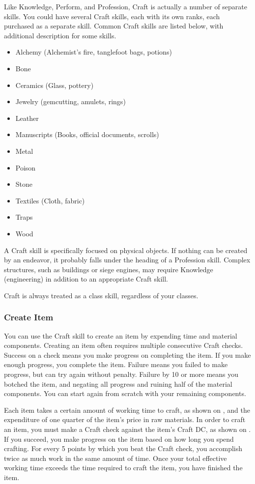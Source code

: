 Like Knowledge, Perform, and Profession, Craft is actually a number of separate skills. You could have several Craft skills, each with its own ranks, each purchased as a separate skill. Common Craft skills are listed below, with additional description for some skills.

\begin{itemize}
  \item Alchemy (Alchemist's fire, tanglefoot bags, potions)
  \item Bone
  \item Ceramics (Glass, pottery)
  \item Jewelry (gemcutting, amulets, rings)
  \item Leather
  \item Manuscripts (Books, official documents, scrolls)
  \item Metal
  \item Poison
  \item Stone
  \item Textiles (Cloth, fabric)
  \item Traps
  \item Wood
\end{itemize}

A Craft skill is specifically focused on physical objects. If nothing can be created by an endeavor, it probably falls under the heading of a Profession skill. Complex structures, such as buildings or siege engines, may require Knowledge (engineering) in addition to an appropriate Craft skill.

Craft is always treated as a class skill, regardless of your classes.

\subsubsection{Create Item}
You can use the Craft skill to create an item by expending time and material components. Creating an item often requires multiple consecutive Craft checks. Success on a check means you make progress on completing the item. If you make enough progress, you complete the item. Failure means you failed to make progress, but can try again without penalty. Failure by 10 or more means you botched the item, and negating all progress and ruining half of the material components. You can start again from scratch with your remaining components.

Each item takes a certain amount of working time to craft, as shown on , and the expenditure of one quarter of the item's price in raw materials. In order to craft an item, you must make a Craft check against the item's Craft DC, as shown on . If you succeed, you make progress on the item based on how long you spend crafting. For every 5 points by which you beat the Craft check, you accomplish twice as much work in the same amount of time. Once your total effective working time exceeds the time required to craft the item, you have finished the item.

